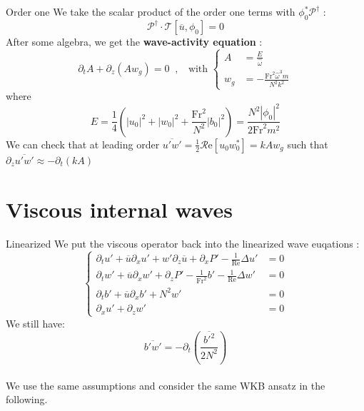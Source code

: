 \documentclass[10pt]{beamer}
\begin{document}
\begin{frame}[fragile]{Order one}
  We take the scalar product of the order one terms with $\phi_{0}^{*}\boldsymbol{\mathcal{P}}^{\dagger}$ : 
  \begin{equation*}
  	\boldsymbol{\mathcal{P}}^{\dagger}\cdot\boldsymbol{\mathcal{T}}\left[\overline{u},\phi_{0} \right]=0
  \end{equation*}
  After some algebra, we get the \textbf{wave\--activity equation} :
  \begin{equation*}
  	\partial_{t}A+\partial_{z}\left(Aw_{g}\right)=0\;\;,\;\;\text{ with }
  	\begin{cases}
  		A&=\frac{E}{\hat{\omega}}\\
  		w_{g}&=-\frac{\mathrm{Fr}^{2}\hat{\omega}^{3} m}{N^{2}k^{2}}
  	\end{cases}
  \end{equation*}
  where 
  \begin{equation*}
  	E=\frac{1}{4}\left(\left\lvert u_{0}\right\rvert^{2}+\left\lvert w_{0}\right\rvert^{2} +\frac{\mathrm{Fr}^{2}}{N^{2}}\left\lvert b_{0}\right\rvert^{2} \right)=\frac{N^{2}\left\lvert \phi_{0}\right\rvert^{2}}{2\mathrm{Fr}^{2}m^{2}}
  \end{equation*}
  We can check that at leading order $\overline{u'w'}=\frac{1}{2}\mathcal{R}\mathrm{e}\left[u_{0}w_{0}^{*} \right]= kAw_{g}$ such that $\partial_{z}\overline{u'w'}\approx-\partial_{t}\left(kA\right)$
\end{frame}

\section{Viscous internal waves}

\begin{frame}{Linearized}
	We put the viscous operator back into the linearized wave euqations :
	\begin{equation*}
    	\begin{cases}
    	 	\partial_{t}u'+\overline{u}\partial_{x}u'+w'\partial_{z}\overline{u} + \partial_{x}P'-\frac{1}{\mathrm{Re}}\Delta u'&=0\\
     	 	\partial_{t}w'+\overline{u}\partial_{x}w'+\partial_{z}P'-\frac{1}{\mathrm{Fr}^{2}}b'-\frac{1}{\mathrm{Re}}\Delta w'&=0\\
     		\partial_{t}b'+\overline{u}\partial_{x}b'+N^{2}w'&=0\\
    	 	\partial_{x}u'+\partial_{z}w'&=0
   		\end{cases}
  	\end{equation*}
  	We still have:
  	\begin{equation*}
  		\overline{b'w'}=-\partial_{t}\left(\frac{\overline{b'^{2}}}{2N^{2}}\right)
  	\end{equation*}\\
   	We use the same assumptions and consider the same WKB ansatz in the following.
\end{frame}
\end{document}
